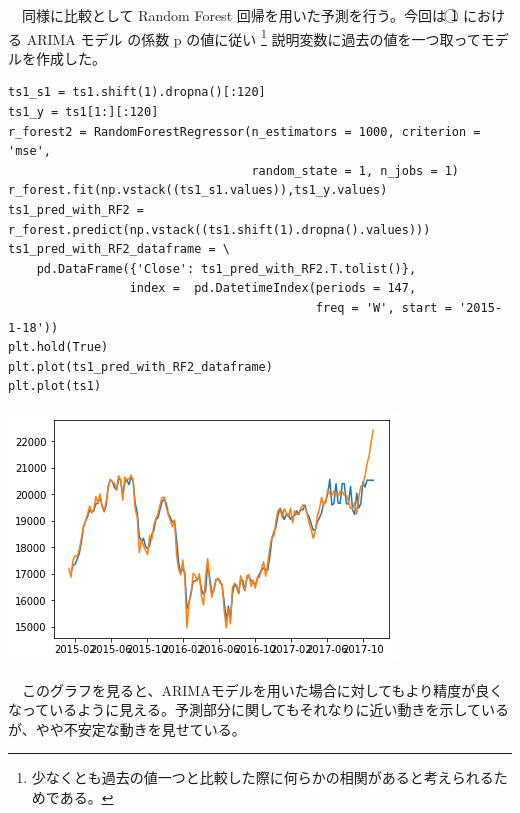 \documentclass{scrartcl}
\begin{document}
　同様に比較として Random Forest 回帰を用いた予測を行う。今回は \textcircled{\scriptsize 1} における ARIMA モデル の係数 p の値に従い \footnote{少なくとも過去の値一つと比較した際に何らかの相関があると考えられるためである。} 説明変数に過去の値を一つ取ってモデルを作成した。\\

\begin{verbatim}
ts1_s1 = ts1.shift(1).dropna()[:120]
ts1_y = ts1[1:][:120]
r_forest2 = RandomForestRegressor(n_estimators = 1000, criterion = 'mse',
                                  random_state = 1, n_jobs = 1)
r_forest.fit(np.vstack((ts1_s1.values)),ts1_y.values)
ts1_pred_with_RF2 = r_forest.predict(np.vstack((ts1.shift(1).dropna().values)))
ts1_pred_with_RF2_dataframe = \
    pd.DataFrame({'Close': ts1_pred_with_RF2.T.tolist()},
                 index =  pd.DatetimeIndex(periods = 147,
                                           freq = 'W', start = '2015-1-18'))
plt.hold(True)
plt.plot(ts1_pred_with_RF2_dataframe)
plt.plot(ts1)
\end{verbatim}

\begin{center}
\includegraphics[width=.9\linewidth]{./obipy-resources/YbLLZi.png}
\end{center}

　このグラフを見ると、ARIMAモデルを用いた場合に対してもより精度が良くなっているように見える。予測部分に関してもそれなりに近い動きを示しているが、やや不安定な動きを見せている。\\
\end{document}
